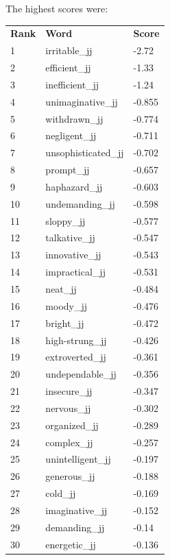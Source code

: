 \documentclass[10pt,letterpaper]{book}
\begin{document}
The highest scores were:
\begin{tabular}{ l l l }
        \textbf{Rank} & \textbf{Word} & \textbf{Score} \\
        1 & irritable\_jj & -2.72 \\
        2 & efficient\_jj & -1.33 \\
        3 & inefficient\_jj & -1.24 \\
        4 & unimaginative\_jj & -0.855 \\
        5 & withdrawn\_jj & -0.774 \\
        6 & negligent\_jj & -0.711 \\
        7 & unsophisticated\_jj & -0.702 \\
        8 & prompt\_jj & -0.657 \\
        9 & haphazard\_jj & -0.603 \\
        10 & undemanding\_jj & -0.598 \\
        11 & sloppy\_jj & -0.577 \\
        12 & talkative\_jj & -0.547 \\
        13 & innovative\_jj & -0.543 \\
        14 & impractical\_jj & -0.531 \\
        15 & neat\_jj & -0.484 \\
        16 & moody\_jj & -0.476 \\
        17 & bright\_jj & -0.472 \\
        18 & high-strung\_jj & -0.426 \\
        19 & extroverted\_jj & -0.361 \\
        20 & undependable\_jj & -0.356 \\
        21 & insecure\_jj & -0.347 \\
        22 & nervous\_jj & -0.302 \\
        23 & organized\_jj & -0.289 \\
        24 & complex\_jj & -0.257 \\
        25 & unintelligent\_jj & -0.197 \\
        26 & generous\_jj & -0.188 \\
        27 & cold\_jj & -0.169 \\
        28 & imaginative\_jj & -0.152 \\
        29 & demanding\_jj & -0.14 \\
        30 & energetic\_jj & -0.136 \\
\end{tabular}
\end{document}
